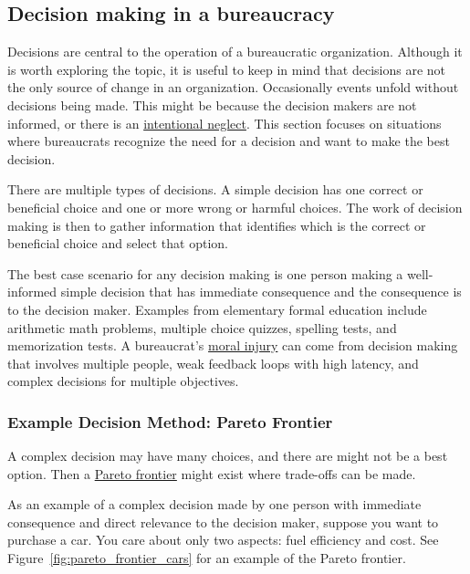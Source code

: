 \subsection{Decision making in a bureaucracy\label{sec:decision-making}}

Decisions are central to the operation of a bureaucratic organization. Although it is worth exploring the topic, it is useful to keep in mind that decisions are not the only source of change in an organization. Occasionally events unfold without decisions being made. This might be because the decision makers are not informed, or there is an \href{https://en.wikipedia.org/wiki/Willful_blindness}{intentional neglect}. This section focuses on situations where bureaucrats recognize the need for a decision and want to make the best decision.

There are multiple types of decisions. 
A \gls{simple decision} has one correct or beneficial choice and one or more wrong or harmful choices. The work of decision making is then to gather information that identifies which is the correct or beneficial choice and select that option.

The best case scenario for any decision making is one person making a well-informed simple decision that has immediate consequence and the consequence is to the decision maker. Examples from elementary formal education include arithmetic math problems, multiple choice quizzes, spelling tests, and memorization tests. A bureaucrat's \href{https://en.wikipedia.org/wiki/Moral_injury}{moral injury} can come from decision making that involves multiple people, weak feedback loops with high latency, and complex decisions for multiple objectives.

\subsubsection{Example Decision Method: Pareto Frontier\label{sec:pareto}}

A complex decision may have many choices, and there are might not be a best option. Then a \href{https://en.wikipedia.org/wiki/Pareto_front}{Pareto frontier} might exist where trade-offs can be made. 

As an example of a complex decision made by one person with immediate consequence and direct relevance to the decision maker, suppose you want to purchase a car. You care about only two aspects: fuel efficiency and cost. See Figure~\ref{fig:pareto_frontier_cars} for an example of the Pareto frontier.


